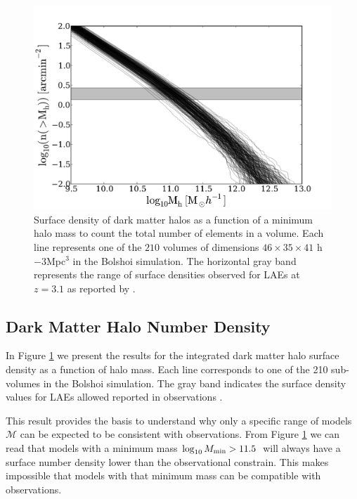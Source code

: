 \documentclass[usenatbib]{mn2e}
\newcommand{\hMsun}{{\ifmmode{h^{-1}{\rm
        {M_{\odot}}}}\else{$h^{-1}{\rm{M_{\odot}}}$}\fi}}
\begin{document}
\begin{figure}
\begin{center}
\includegraphics[width=1.10\linewidth,angle=0]{./plots/Fig1.pdf}
\caption{ \label{fig:halos} Surface density of dark
  matter halos as a function of a minimum halo mass to count the
  total number of elements in a volume. Each line represents one of the
  $210$ volumes of dimensions $46\times 35\times 41$ h${-3}$Mpc$^{3}$
  in the Bolshoi simulation. The horizontal gray band represents the
  range of surface densities observed for LAEs at $z=3.1$ as reported
  by \citep{Yamada2012}.}
\end{center} 
\end{figure}


\subsection{Dark Matter Halo Number Density}

In Figure \ref{fig:halos} we present the results for  the
integrated dark matter halo surface density as a function of halo
mass. Each line corresponds to one of the 210 sub-volumes in the
Bolshoi simulation. The gray band indicates the surface density
values for LAEs allowed reported in observations \citep{Yamada2012}.
 
This result provides the basis to understand why only a specific range of models
${\mathcal M}$ can be expected to be consistent with
observations. From Figure \ref{fig:halos} we can read that models
with a minimum mass $\log_{10} M_{\rm min}>11.5$\hMsun \ will always have a
surface number density lower than the observational
constrain. This makes impossible that models with that minimum mass
can be compatible with observations.
\end{document}
